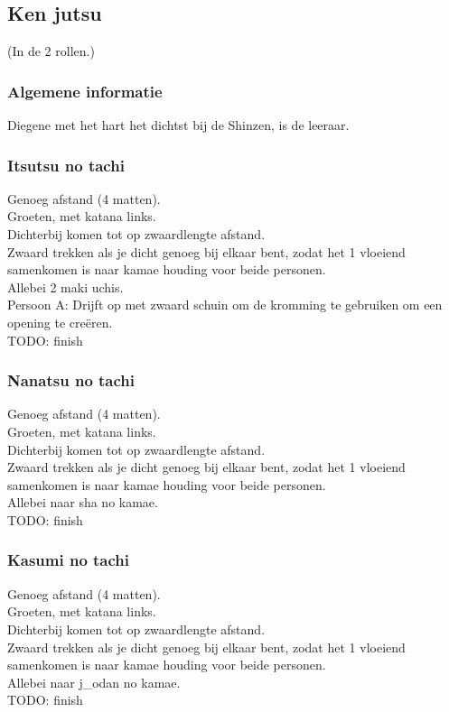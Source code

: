 \subsection{Ken jutsu}
(In de 2 rollen.)

\subsubsection{Algemene informatie}

Diegene met het hart het dichtst bij de Shinzen, is de leeraar.\\

\subsubsection{Itsutsu no tachi}

Genoeg afstand (4 matten).\\
Groeten, met katana links.\\
Dichterbij komen tot op zwaardlengte afstand.\\
Zwaard trekken als je dicht genoeg bij elkaar bent, zodat het 1 vloeiend samenkomen is naar kamae houding voor beide personen.\\
Allebei 2 maki uchis.\\
Persoon A: Drijft op met zwaard schuin om de kromming te gebruiken om een opening te cre\"{e}ren.\\
TODO: finish

\subsubsection{Nanatsu no tachi}

Genoeg afstand (4 matten).\\
Groeten, met katana links.\\
Dichterbij komen tot op zwaardlengte afstand.\\
Zwaard trekken als je dicht genoeg bij elkaar bent, zodat het 1 vloeiend samenkomen is naar kamae houding voor beide personen.\\
Allebei naar sha no kamae.\\
TODO: finish

\subsubsection{Kasumi no tachi}

Genoeg afstand (4 matten).\\
Groeten, met katana links.\\
Dichterbij komen tot op zwaardlengte afstand.\\
Zwaard trekken als je dicht genoeg bij elkaar bent, zodat het 1 vloeiend samenkomen is naar kamae houding voor beide personen.\\
Allebei naar j\_{o}dan no kamae.\\
TODO: finish

